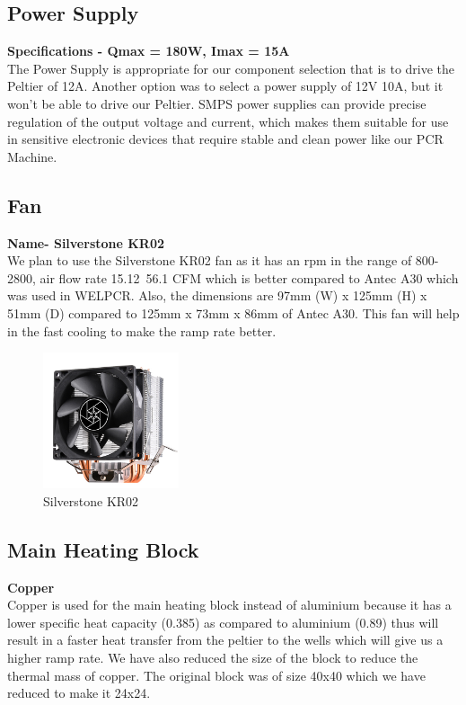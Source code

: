 \documentclass{article}
\begin{document}
\subsection{Power Supply}
\textbf{Specifications - Qmax = 180W, Imax = 15A}\\
The Power Supply is appropriate for our component selection that is to drive the Peltier of 12A. Another option was to select a power supply of 12V 10A, but it won't be able to drive our Peltier. SMPS power supplies can provide precise regulation of the output voltage and current, which makes them suitable for use in sensitive electronic devices that require stable and clean power like our PCR Machine.

\subsection{Fan}
\textbf{Name- Silverstone KR02}\\
We plan to use the Silverstone KR02 fan as it has an rpm in the range of 800-2800, air flow rate 15.12~56.1 CFM which is better compared to Antec A30 which was used in WELPCR. Also, the dimensions are 97mm (W) x 125mm (H) x 51mm (D) compared to 125mm x 73mm x 86mm of Antec A30. This fan will help in the fast cooling to make the ramp rate better.


\begin{figure}[htp]
    \centering
    \includegraphics[width=4cm]{Images/fan.jpg}
    \caption{Silverstone KR02}
    \label{fig:galaxy}
\end{figure}


\subsection{Main Heating Block}
\textbf{Copper}\\
Copper is used for the main heating block instead of aluminium because it has a lower specific heat capacity (0.385) as compared to aluminium (0.89) thus will result in a faster heat transfer from the peltier to the wells which will give us a higher ramp rate. We have also reduced the size of the block to reduce the thermal mass of copper. The original block was of size 40x40 which we have reduced to make it 24x24.
\end{document}
